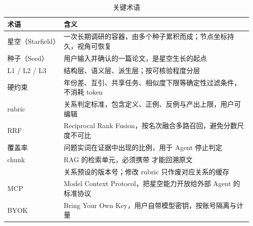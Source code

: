 \begin{table}[htbp]
  \centering
  \footnotesize
  \caption{关键术语}
  \label{tab:glossary}
  \begin{tabularx}{\textwidth}{L{3.3cm}Y}
    \toprule
\textbf{术语} & \textbf{含义} \\
    \midrule
    星空（Starfield） & 一次长期调研的容器，由多个种子累积而成；节点坐标持久，视角可恢复 \\
    种子（Seed） & 用户输入并确认的一篇论文，是星空生长的起点 \\
    L1 / L2 / L3 & 结构层、语义层、派生层；按可核验程度分层 \\
    硬约束 & 年份差、互引、共享任务、相似度下限等确定性过滤条件，不消耗 token \\
    rubric & 关系判定标准，包含定义、正例、反例与产出上限，用户可编辑 \\
    RRF & Reciprocal Rank Fusion，按名次融合多路召回，避免分数尺度不可比 \\
    覆盖率 & 问题实词在证据中出现的比例，用于 Agent 停止判定 \\
    chunk & RAG 的检索单元，必须携带  才能回溯原文 \\
     & 关系预设的版本号；修改 rubric 只作废对应关系的缓存 \\
    MCP & Model Context Protocol，把星空能力开放给外部 Agent 的标准协议 \\
    BYOK & Bring Your Own Key，用户自带模型密钥，按账号隔离与计量 \\
    \bottomrule
  \end{tabularx}
\end{table}
